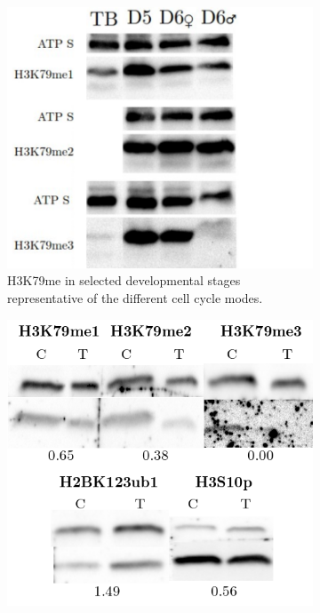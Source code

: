 \documentclass[11pt,twoside,a4paper]{report}
\begin{document}
	\begin{figure}[h!]
		\setlength{\belowcaptionskip}{5pt}
		\centering
		\begin{subfigure}{.5\textwidth}
			\centering
			\includegraphics[width=1\linewidth]{pngs/K79me_WT.png}
			\caption{H3K79me in selected developmental stages representative of the different cell cycle modes.}
		\end{subfigure}%
		\begin{subfigure}{.5\textwidth}
			\centering
			\includegraphics[width=1\linewidth]{pngs/TB_Dot1_in.png}

\end{subfigure}
\end{figure}
\end{document}
